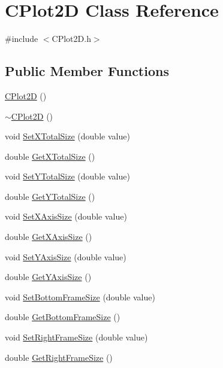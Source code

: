 \hypertarget{class_c_plot2_d}{\section{C\-Plot2\-D Class Reference}
\label{class_c_plot2_d}
}


{\ttfamily \#include $<$C\-Plot2\-D.\-h$>$}

\subsection*{Public Member Functions}
\begin{DoxyCompactItemize}
\item 
\hyperlink{class_c_plot2_d_a246d313948262010a6b4c0ae35dcd018}{C\-Plot2\-D} ()
\item 
\hyperlink{class_c_plot2_d_a9e01637ebd758d0f1a0e393599c94a12}{$\sim$\-C\-Plot2\-D} ()
\item 
void \hyperlink{class_c_plot2_d_ab9b38f3e6f5071059ae8f514f690bbfe}{Set\-X\-Total\-Size} (double value)
\item 
double \hyperlink{class_c_plot2_d_ad762b6bf641388419e53fbfb2e5e18e5}{Get\-X\-Total\-Size} ()
\item 
void \hyperlink{class_c_plot2_d_a73096f8f28b2906c527ee30119798514}{Set\-Y\-Total\-Size} (double value)
\item 
double \hyperlink{class_c_plot2_d_af920eb0c804daf3ee7dcad652cb39fbd}{Get\-Y\-Total\-Size} ()
\item 
void \hyperlink{class_c_plot2_d_aad074f797f9e1ac3d302d270dc4aa51d}{Set\-X\-Axis\-Size} (double value)
\item 
double \hyperlink{class_c_plot2_d_afd3f76d0353c5500dd42469f4b235f6d}{Get\-X\-Axis\-Size} ()
\item 
void \hyperlink{class_c_plot2_d_a2d399c93675a47d61c1d8d9c0c456202}{Set\-Y\-Axis\-Size} (double value)
\item 
double \hyperlink{class_c_plot2_d_a8715b40470a9483e9d4b3c703b9b22af}{Get\-Y\-Axis\-Size} ()
\item 
void \hyperlink{class_c_plot2_d_aa5f9d5dcbc78b6dd980a14fa8425afa1}{Set\-Bottom\-Frame\-Size} (double value)
\item 
double \hyperlink{class_c_plot2_d_a5f3fb4c68c15afa7a7ee231c8cb107f3}{Get\-Bottom\-Frame\-Size} ()
\item 
void \hyperlink{class_c_plot2_d_a247457da5056e2aa7981e507b407ceb5}{Set\-Right\-Frame\-Size} (double value)
\item 
double \hyperlink{class_c_plot2_d_a1de42c8c06694509ae950315665f46b7}{Get\-Right\-Frame\-Size} ()

\end{DoxyCompactItemize}
